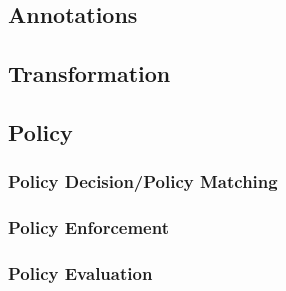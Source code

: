 \subsection{Annotations}
\subsection{Transformation}
\subsection{Policy}

\subsubsection{Policy Decision/Policy Matching}
\subsubsection{Policy Enforcement}
\subsubsection{Policy Evaluation}